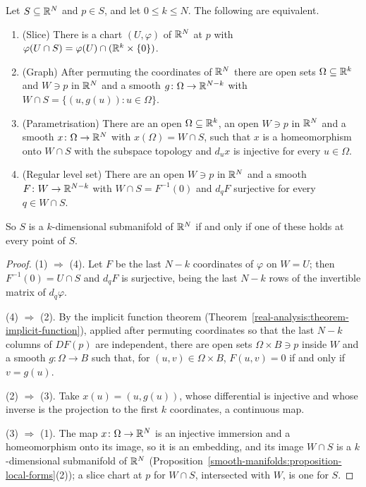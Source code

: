 \begin{proposition}\label{smooth-manifolds:proposition-submanifold-criteria}
Let $S \subseteq \mathbb{R}^N$ and $p \in S$, and let $0 \leq k \leq N$. The following are equivalent.
\begin{enumerate}
\item (Slice) There is a chart $(U, \varphi)$ of $\mathbb{R}^N$ at $p$ with $\varphi(U \cap S) = \varphi(U) \cap (\mathbb{R}^k \times \{0\})$.
\item (Graph) After permuting the coordinates of $\mathbb{R}^N$ there are open sets $\Omega \subseteq \mathbb{R}^k$ and $W \ni p$ in $\mathbb{R}^N$ and a smooth
$g \colon \Omega \to \mathbb{R}^{N-k}$ with $W \cap S = \{(u, g(u)) : u \in \Omega\}$.
\item (Parametrisation) There are an open $\Omega \subseteq \mathbb{R}^k$, an open $W \ni p$ in $\mathbb{R}^N$ and a smooth $x \colon \Omega \to \mathbb{R}^N$ with $x(\Omega) = W \cap S$,
such that $x$ is a homeomorphism onto $W \cap S$ with the subspace topology and $d_ux$ is injective for every $u \in \Omega$.
\item (Regular level set) There are an open $W \ni p$ in $\mathbb{R}^N$ and a smooth $F \colon W \to \mathbb{R}^{N-k}$ with $W \cap S = F^{-1}(0)$ and $d_qF$ surjective for every
$q \in W \cap S$.
\end{enumerate}
So $S$ is a $k$-dimensional submanifold of $\mathbb{R}^N$ if and only if one of these holds at every point of $S$.
\end{proposition}

\begin{proof}
(1) $\Rightarrow$ (4). Let $F$ be the last $N - k$ coordinates of $\varphi$ on $W = U$; then $F^{-1}(0) = U \cap S$ and $d_qF$ is surjective, being the last $N - k$
rows of the invertible matrix of $d_q\varphi$.

(4) $\Rightarrow$ (2). By the implicit function theorem (Theorem~\ref{real-analysis:theorem-implicit-function}), applied after permuting coordinates so that the
last $N - k$ columns of $DF(p)$ are independent, there are open sets $\Omega \times B \ni p$ inside $W$ and a smooth $g \colon \Omega \to B$ such that, for
$(u, v) \in \Omega \times B$, $F(u, v) = 0$ if and only if $v = g(u)$.

(2) $\Rightarrow$ (3). Take $x(u) = (u, g(u))$, whose differential is injective and whose inverse is the projection to the first $k$ coordinates, a continuous
map.

(3) $\Rightarrow$ (1). The map $x \colon \Omega \to \mathbb{R}^N$ is an injective immersion and a homeomorphism onto its image, so it is an embedding, and its image
$W \cap S$ is a $k$-dimensional submanifold of $\mathbb{R}^N$ (Proposition~\ref{smooth-manifolds:proposition-local-forms}(2)); a slice chart at $p$ for $W \cap S$,
intersected with $W$, is one for $S$.
\end{proof}

